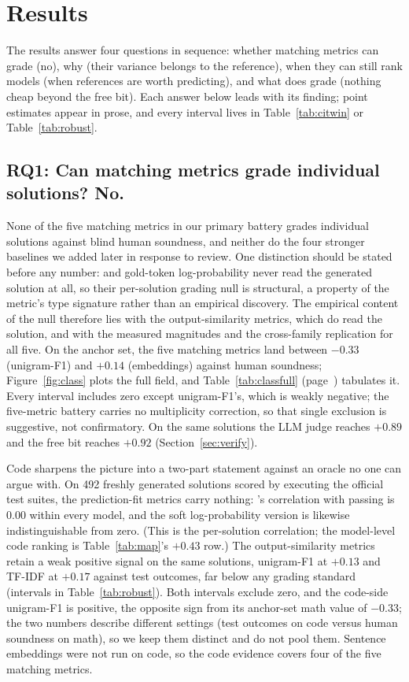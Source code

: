 \section{Results}
\label{sec:results}

The results answer four questions in sequence: whether matching metrics can grade (no), why (their variance belongs to the reference), when they can still rank models (when references are worth predicting), and what does grade (nothing cheap beyond the free bit).
Each answer below leads with its finding; point estimates appear in prose, and every interval lives in Table~\ref{tab:citwin} or Table~\ref{tab:robust}.

\subsection{RQ1: Can matching metrics grade individual solutions? No.}
\label{sec:classnull}

None of the five matching metrics in our primary battery grades individual solutions against blind human soundness, and neither do the four stronger baselines we added later in response to review.
One distinction should be stated before any number: \tfa{} and gold-token log-probability never read the generated solution at all, so their per-solution grading null is structural, a property of the metric's type signature rather than an empirical discovery.
The empirical content of the null therefore lies with the output-similarity metrics, which do read the solution, and with the measured magnitudes and the cross-family replication for all five.
On the anchor set, the five matching metrics land between $-0.33$ (unigram-F1) and $+0.14$ (embeddings) against human soundness; Figure~\ref{fig:class} plots the full field, and Table~\ref{tab:classfull} (page~\pageref{tab:classfull}) tabulates it.
Every interval includes zero except unigram-F1's, which is weakly negative; the five-metric battery carries no multiplicity correction, so that single exclusion is suggestive, not confirmatory.
On the same solutions the LLM judge reaches $+0.89$ and the free bit reaches $+0.92$ (Section~\ref{sec:verify}).

Code sharpens the picture into a two-part statement against an oracle no one can argue with.
On 492 freshly generated solutions scored by executing the official test suites, the prediction-fit metrics carry nothing: \tfa's correlation with passing is $0.00$ within every model, and the soft log-probability version is likewise indistinguishable from zero.
(This is the per-solution correlation; the model-level code ranking is Table~\ref{tab:map}'s $+0.43$ row.)
The output-similarity metrics retain a weak positive signal on the same solutions, unigram-F1 at $+0.13$ and TF-IDF at $+0.17$ against test outcomes, far below any grading standard (intervals in Table~\ref{tab:robust}).
Both intervals exclude zero, and the code-side unigram-F1 is positive, the opposite sign from its anchor-set math value of $-0.33$; the two numbers describe different settings (test outcomes on code versus human soundness on math), so we keep them distinct and do not pool them.
Sentence embeddings were not run on code, so the code evidence covers four of the five matching metrics.


